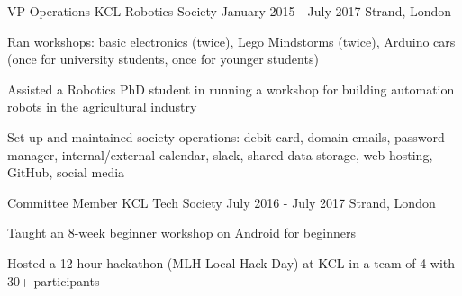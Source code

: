 

\begin{cventries}

  \cventry
    {VP Operations} %
    {KCL Robotics Society} %
    {January 2015 - July 2017} %
    {Strand, London} %
    {
      \begin{cvitems} %
        \item {Ran workshops: basic electronics (twice), Lego Mindstorms (twice), Arduino cars (once for university students, once for younger students)}
        \item {Assisted a Robotics PhD student in running a workshop for building automation robots in the agricultural industry}
        \item {Set-up and maintained society operations: debit card, domain emails, password manager, internal/external calendar, slack, shared data storage, web hosting, GitHub, social media}
      \end{cvitems}
    }

  \cventry
    {Committee Member} %
    {KCL Tech Society} %
    {July 2016 - July 2017} %
    {Strand, London} %
    {
      \begin{cvitems} %
      	\item {Taught an 8-week beginner workshop on Android for beginners}
        \item {Hosted a 12-hour hackathon (MLH Local Hack Day) at KCL in a team of 4 with 30+ participants}
      \end{cvitems}
    }

\end{cventries}
